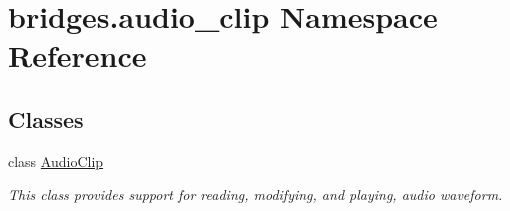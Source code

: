 \hypertarget{namespacebridges_1_1audio__clip}{}\section{bridges.\+audio\+\_\+clip Namespace Reference}
\label{namespacebridges_1_1audio__clip}
\subsection*{Classes}
\begin{DoxyCompactItemize}
\item 
class \hyperlink{classbridges_1_1audio__clip_1_1_audio_clip}{Audio\+Clip}
\begin{DoxyCompactList}\small\item\em This class provides support for reading, modifying, and playing, audio waveform. \end{DoxyCompactList}\end{DoxyCompactItemize}
